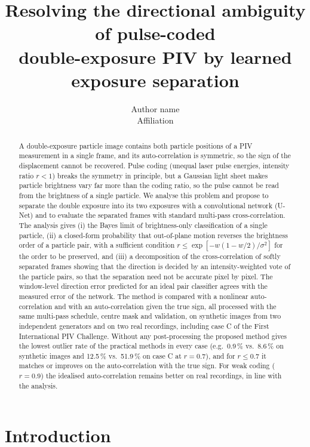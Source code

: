 \documentclass[11pt]{article}
\title{Resolving the directional ambiguity of pulse-coded\\ double-exposure PIV by learned exposure separation}
\author{Author name\\ \small Affiliation}
\date{}
\theoremstyle{remark}
\begin{document}
\maketitle

\begin{abstract}
A double-exposure particle image contains both particle positions of a PIV measurement in a single frame, and its auto-correlation is symmetric, so the sign of the displacement cannot be recovered.
Pulse coding (unequal laser pulse energies, intensity ratio $r<1$) breaks the symmetry in principle, but a Gaussian light sheet makes particle brightness vary far more than the coding ratio, so the pulse cannot be read from the brightness of a single particle.
We analyse this problem and propose to separate the double exposure into its two exposures with a convolutional network (U-Net) and to evaluate the separated frames with standard multi-pass cross-correlation.
The analysis gives (i) the Bayes limit of brightness-only classification of a single particle, (ii) a closed-form probability that out-of-plane motion reverses the brightness order of a particle pair, with a sufficient condition $r \le \exp[-w(1-w/2)/\sigma^2]$ for the order to be preserved, and (iii) a decomposition of the cross-correlation of softly separated frames showing that the direction is decided by an intensity-weighted vote of the particle pairs, so that the separation need not be accurate pixel by pixel.
The window-level direction error predicted for an ideal pair classifier agrees with the measured error of the network.
The method is compared with a nonlinear auto-correlation and with an auto-correlation given the true sign, all processed with the same multi-pass schedule, centre mask and validation, on synthetic images from two independent generators and on two real recordings, including case C of the First International PIV Challenge.
Without any post-processing the proposed method gives the lowest outlier rate of the practical methods in every case (e.g.\ 0.9\,\% vs.\ 8.6\,\% on synthetic images and 12.5\,\% vs.\ 51.9\,\% on case C at $r=0.7$), and for $r\le0.7$ it matches or improves on the auto-correlation with the true sign.
For weak coding ($r=0.9$) the idealised auto-correlation remains better on real recordings, in line with the analysis.
\end{abstract}

\section{Introduction}
\end{document}
